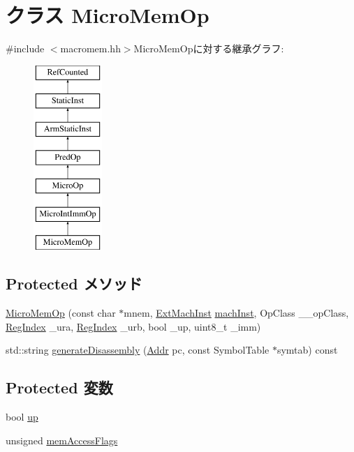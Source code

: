 \hypertarget{classArmISA_1_1MicroMemOp}{
\section{クラス MicroMemOp}
\label{classArmISA_1_1MicroMemOp}
}


{\ttfamily \#include $<$macromem.hh$>$}MicroMemOpに対する継承グラフ:\begin{figure}[H]
\begin{center}
\leavevmode
\includegraphics[height=7cm]{classArmISA_1_1MicroMemOp}
\end{center}
\end{figure}
\subsection*{Protected メソッド}
\begin{DoxyCompactItemize}
\item 
\hyperlink{classArmISA_1_1MicroMemOp_aa3d3e0b762997684acc50593592bb84b}{MicroMemOp} (const char $\ast$mnem, \hyperlink{classStaticInst_a5605d4fc727eae9e595325c90c0ec108}{ExtMachInst} \hyperlink{classStaticInst_a744598b194ca3d4201d9414ce4cc4af4}{machInst}, OpClass \_\-\_\-opClass, \hyperlink{classStaticInst_a36d25e03e43fa3bb4c5482cbefe5e0fb}{RegIndex} \_\-ura, \hyperlink{classStaticInst_a36d25e03e43fa3bb4c5482cbefe5e0fb}{RegIndex} \_\-urb, bool \_\-up, uint8\_\-t \_\-imm)
\item 
std::string \hyperlink{classArmISA_1_1MicroMemOp_a95d323a22a5f07e14d6b4c9385a91896}{generateDisassembly} (\hyperlink{classm5_1_1params_1_1Addr}{Addr} pc, const SymbolTable $\ast$symtab) const 
\end{DoxyCompactItemize}
\subsection*{Protected 変数}
\begin{DoxyCompactItemize}
\item 
bool \hyperlink{classArmISA_1_1MicroMemOp_a7155f867ab504d48e40f4b43a4d9daf6}{up}
\item 
unsigned \hyperlink{classArmISA_1_1MicroMemOp_a827c936c9e2b1f1cf21a01f204a8d821}{memAccessFlags}
\end{DoxyCompactItemize}


